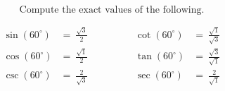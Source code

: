 $$
\text{Compute the exact values of the following.}
$$

$$
\begin{align*}
  \sin(60^{\circ}) &=\ \frac{\sqrt{3}}{2} \qquad&\qquad \cot(60^{\circ}) &=\ \frac{\sqrt{1}}{\sqrt{3}} \\[2ex]
  \cos(60^{\circ}) &=\ \frac{\sqrt{1}}{2} \qquad&\qquad \tan(60^{\circ}) &=\ \frac{\sqrt{3}}{\sqrt{1}} \\[2ex]
  \csc(60^{\circ}) &=\ \frac{2}{\sqrt{3}} \qquad&\qquad \sec(60^{\circ}) &=\ \frac{2}{\sqrt{1}}
\end{align*}
$$
